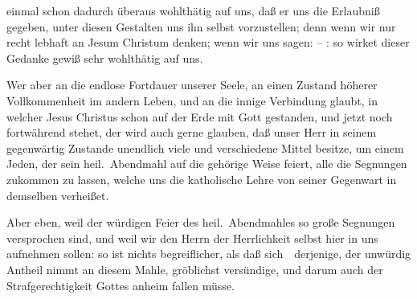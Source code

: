 \begin{aufzb}
\begin{aufzc}
\item einmal schon dadurch überaus wohlthätig auf uns, daß er uns die Erlaubniß gegeben, unter diesen Gestalten uns ihn selbst vorzustellen; denn wenn wir nur recht lebhaft an Jesum Christum denken; wenn wir uns sagen:  -- : so wirket dieser Gedanke gewiß sehr wohlthätig auf uns.
\item Wer aber an die endlose Fortdauer unserer Seele, an einen Zustand höherer Vollkommenheit im andern Leben, und an die innige Verbindung glaubt, in welcher Jesus Christus schon auf der Erde mit Gott gestanden, und jetzt noch fortwährend stehet, der wird auch gerne glauben, daß unser Herr in seinem gegenwärtig  Zustande unendlich viele und verschiedene Mittel besitze, um einem Jeden, der sein heil.\ Abendmahl auf die gehörige Weise feiert, alle die Segnungen zukommen zu lassen, welche uns die katholische Lehre von seiner Gegenwart in demselben verheißet.
\end{aufzc}
\item Aber eben, weil der würdigen Feier des heil.\ Abendmahles so große Segnungen versprochen sind, und weil wir den Herrn der Herrlichkeit selbst hier in uns aufnehmen sollen: so ist nichts begreiflicher, als daß sich~\ derjenige, der unwürdig Antheil nimmt an diesem Mahle, gröblichst versündige, und darum auch der Strafgerechtigkeit Gottes anheim fallen müsse.
\end{aufzb}
